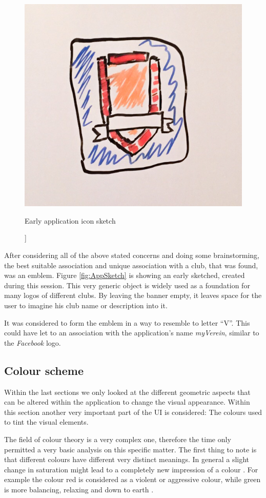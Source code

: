 \begin{figure}[h]
  	\centering
  	\includegraphics[width=0.5\linewidth]{./images/app-sketch.jpg}
  	\caption[Early application icon sketch [own figure]]{Early application icon sketch}
	\label{fig:AppSketch}
\end{figure}

After considering all of the above stated concerns and doing some brainstorming, the best suitable association and unique association with a club, that was found, was an emblem. Figure \vref{fig:AppSketch} is showing an early sketched, created during this session. This very generic object is widely used as a foundation for many logos of different clubs. By leaving the banner empty, it leaves space for the user to imagine his club name or description into it. 

It was considered to form the emblem in a way to resemble to letter \enquote{V}. This could have let to an association with the application's name \emph{myVerein}, similar to the \emph{Facebook} logo. 

\subsection{Colour scheme}

Within the last sections we only looked at the different geometric aspects that can be altered within the application to change the visual appearance. Within this section another very important part of the \acrshort{UI} is considered: The colours used to tint the visual elements. 

The field of colour theory is a very complex one, therefore the time only permitted a very basic analysis on this specific matter. The first thing to note is that different colours have different very distinct meanings. In general a slight change in saturation might lead to a completely new impression of a colour \cite{Chapman:2010aa}. For example the colour red is considered as a violent or aggressive colour, while green is more balancing, relaxing and down to earth \cite{Chapman:2010aa}.


